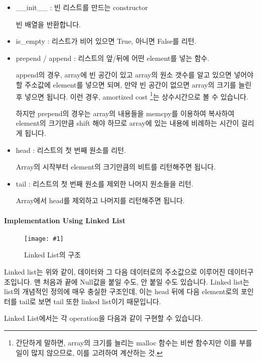 \documentclass[titlepage]{report}
\newcommand\fig[2]{
\begin{figure}[h]
  \centering
  \texttt{[image: \#1]}
  \caption{#2} 
  \label{fig:#1}
\end{figure}
}
\begin{document}
\begin{itemize} 
\item \_\_init\_\_ : 빈 리스트를 만드는 constructor

빈 배열을 반환합니다. 
\item is\_empty : 리스트가 비어 있으면 True, 아니면 False를 리턴. 
\item prepend / append : 리스트의 앞/뒤에 어떤 element를 넣는 함수. 

append의 경우, array에 빈 공간이 있고 array의 원소 갯수를 알고 있으면 넣어야 할 주소값에 element를 넣으면 되며, 만약 빈 공간이 없으면 array의 크기를 늘린 후 넣으면 됩니다. 이런 경우, amortized cost \footnote{간단하게 말하면, array의 크기를 늘리는 malloc 함수는 비싼 함수지만 이를 부를 일이 많지 않으므로, 이를 고려하여 계산하는 것.}는 상수시간으로 볼 수 있습니다. 

하지만 prepend의 경우는 array의 내용들을 memcpy를 이용하여 복사하여 element의 크기만큼 shift 해야 하므로 array에 있는 내용에 비례하는 시간이 걸리게 됩니다. 
 
\item head : 리스트의 첫 번째 원소를 리턴. 

Array의 시작부터 element의 크기만큼의 비트를 리턴해주면 됩니다. 

\item tail : 리스트의 첫 번째 원소를 제외한 나머지 원소들을 리턴. 

Array에서 head를 제외하고 나머지를 리턴해주면 됩니다. 
\end{itemize}

\paragraph{Implementation Using Linked List}

\fig{linkedlist}{Linked List의 구조} 

Linked list는 위와 같이, 데이터와 그 다음 데이터로의 주소값으로 이루어진 데이터구조입니다. 맨 처음과 끝에 Null값을 붙일 수도, 안 붙일 수도 있습니다. Linked list는 list의 개념적인 정의에 매우 충실한 구조인데, 이는 head 뒤에 다음 element로의 포인터를 tail로 보면 tail 또한 linked list이기 때문입니다. 

Linked List에서는 각 operation을 다음과 같이 구현할 수 있습니다. 
\end{document}
